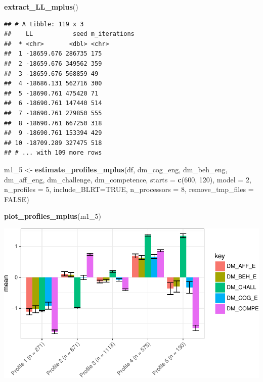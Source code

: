 \documentclass[]{msu-thesis}
\newenvironment{Shaded}{\begin{snugshade}}{\end{snugshade}}
\newcommand{\KeywordTok}[1]{\textcolor[rgb]{0.13,0.29,0.53}{\textbf{#1}}}
\newcommand{\DataTypeTok}[1]{\textcolor[rgb]{0.13,0.29,0.53}{#1}}
\newcommand{\DecValTok}[1]{\textcolor[rgb]{0.00,0.00,0.81}{#1}}
\newcommand{\StringTok}[1]{\textcolor[rgb]{0.31,0.60,0.02}{#1}}
\newcommand{\OtherTok}[1]{\textcolor[rgb]{0.56,0.35,0.01}{#1}}
\newcommand{\NormalTok}[1]{#1}
\theoremstyle{definition}
\theoremstyle{definition}
\theoremstyle{definition}
\theoremstyle{remark}
\begin{document}
\begin{Shaded}
\begin{Highlighting}[]
\KeywordTok{extract_LL_mplus}\NormalTok{()}
\end{Highlighting}
\end{Shaded}

\begin{verbatim}
## # A tibble: 119 x 3
##    LL           seed m_iterations
##  * <chr>       <dbl> <chr>       
##  1 -18659.676 286735 175         
##  2 -18659.676 349562 359         
##  3 -18659.676 568859 49          
##  4 -18686.131 562716 300         
##  5 -18690.761 475420 71          
##  6 -18690.761 147440 514         
##  7 -18690.761 279850 555         
##  8 -18690.761 667250 318         
##  9 -18690.761 153394 429         
## 10 -18709.289 327475 518         
## # ... with 109 more rows
\end{verbatim}

\begin{Shaded}
\begin{Highlighting}[]
\NormalTok{m1_}\DecValTok{5}\NormalTok{ <-}\StringTok{ }\KeywordTok{estimate_profiles_mplus}\NormalTok{(df,  }
\NormalTok{                             dm_cog_eng, dm_beh_eng, dm_aff_eng, dm_challenge, dm_competence,}
                             \DataTypeTok{starts =} \KeywordTok{c}\NormalTok{(}\DecValTok{600}\NormalTok{, }\DecValTok{120}\NormalTok{),}
                             \DataTypeTok{model =} \DecValTok{2}\NormalTok{,}
                             \DataTypeTok{n_profiles =} \DecValTok{5}\NormalTok{,}
                             \DataTypeTok{include_BLRT=}\OtherTok{TRUE}\NormalTok{,}
                             \DataTypeTok{n_processors =} \DecValTok{8}\NormalTok{, }\DataTypeTok{remove_tmp_files =} \OtherTok{FALSE}\NormalTok{)}

\KeywordTok{plot_profiles_mplus}\NormalTok{(m1_}\DecValTok{5}\NormalTok{)}
\end{Highlighting}
\end{Shaded}

\includegraphics{rosenberg-dissertation_files/figure-latex/spec-solutions-model2-5-1.pdf}
\end{document}
